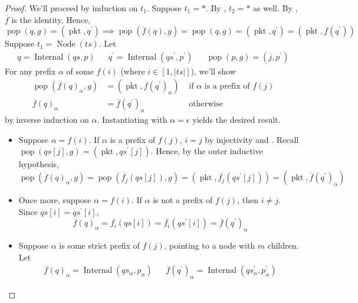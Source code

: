 \documentclass{amsart}
\DeclareMathOperator{\pkt}{\mathrm{pkt}}
\DeclareMathOperator{\pop}{\mathrm{pop}}
\DeclareMathOperator{\Internal}{\mathrm{Internal}}
\DeclareMathOperator{\Node}{\mathrm{Node}}
\theoremstyle{definition}
\begin{document}
\begin{proof}
    We'll proceed by induction on $t_1$.
    Suppose $t_1 = \ast$.
    By \cite[Lemma ~5.3]{OG}, $t_2 = \ast$ as well.
    By , $\overline{f}$ is the identity.
    Hence, 
    $$\pop(q, g) = (\pkt, q^\prime) \implies \pop(\overline{f}(q), g) = \pop(q, g) = (\pkt, q^\prime) = (\pkt, \overline{f}(q^\prime))$$
    Suppose $t_1 = \Node(ts)$. 
    Let 
    \begin{align*}
        q = \Internal(qs, p) &&
        q^\prime = \Internal(qs^\prime, p^\prime) &&
        \pop(p, g) = (j, p^\prime)
    \end{align*}
    For any prefix $\alpha$ of some $f(i)$ (where $i \in [1, |ts|]$), we'll show
    \begin{align*}
        \pop(\overline{f}(q)_\alpha, g) &= (\pkt, \overline{f}(q^\prime)_\alpha) &\text{ if $\alpha$ is a prefix of $f(j)$} \tag{$\dagger$} \label{eq:popinduc}\\
        \overline{f}(q)_\alpha &= \overline{f}(q^\prime)_\alpha &\text{ otherwise}
    \end{align*}
    by inverse induction on $\alpha$. Instantiating  with $\alpha = \epsilon$ yields the desired result.
    \begin{itemize}
        \item Suppose $\alpha = f(i)$. 
            If $\alpha$ is a prefix of $f(j)$, $i = j$ by injectivity and \cite[Definition ~5.2, Equation (3)]{OG}.
            Recall $\pop(qs[j], g) = (\pkt, qs^\prime[j])$.
            Hence, by the outer inductive hypothesis,
            $$
                \pop(\overline{f}(q)_\alpha, g) = 
                \pop(\overline{f_j}(qs[j]), g) = 
                (\pkt, \overline{f_j}(qs^\prime[j])) = 
                (\pkt, \overline{f}(q^\prime)_\alpha)
            $$
        \item Once more, suppose $\alpha = f(i)$.
            If $\alpha$ is not a prefix of $f(j)$, then $i \neq j$.
            Since $qs[i] = qs^\prime[i]$,
            $$
                \overline{f}(q)_\alpha =
                \overline{f_i}(qs[i]) =
                \overline{f_i}(qs^\prime[i]) = 
                \overline{f}(q^\prime)_\alpha
            $$
        \item Suppose $\alpha$ is some strict prefix of $f(j)$, pointing to a node with $m$ children.
            Let 
            \begin{align*}
                \overline{f}(q)_\alpha = \Internal(qs_\alpha, p_\alpha) &&
                \overline{f}(q^\prime)_\alpha = \Internal(qs^{\prime}_\alpha, p^{\prime}_\alpha)

\end{align*}
\end{itemize}
\end{proof}
\end{document}
